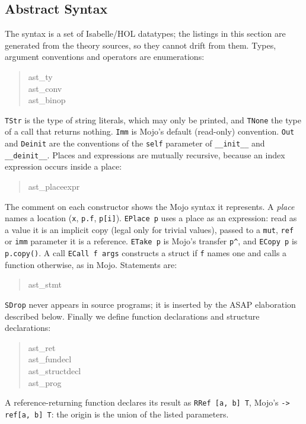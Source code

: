 \documentclass[11pt,a4paper]{article}
\newcommand{\usesnip}[1]{\csname #1\endcsname}
\newenvironment{snippet}{\begin{quote}\small}{\end{quote}}
\newcommand{\IHOL}{Isabelle/HOL}
\newcommand{\code}[1]{\texttt{#1}}
\begin{document}
\subsection{Abstract Syntax}
The syntax is a set of \IHOL{} datatypes; the listings in this section are
generated from the theory sources, so they cannot drift from them. Types,
argument conventions and operators are enumerations:
\begin{snippet}
\begin{isabelle}
\usesnip{ast_ty}\\[0.3em]
\usesnip{ast_conv}\\[0.3em]
\usesnip{ast_binop}
\end{isabelle}
\end{snippet}
\code{TStr} is the type of string literals, which may only be printed, and
\code{TNone} the type of a call that returns nothing. \code{Imm} is Mojo's default
(read-only) convention. \code{Out} and \code{Deinit} are the conventions of the
\code{self} parameter of \code{\_\_init\_\_} and \code{\_\_deinit\_\_}. Places and
expressions are mutually recursive, because an index expression occurs inside a
place:
\begin{snippet}
\begin{isabelle}
\usesnip{ast_placeexpr}
\end{isabelle}
\end{snippet}
The comment on each constructor shows the Mojo syntax it represents. A \emph{place} names a location (\code{x}, \code{p.f}, \code{p[i]}). \code{EPlace p}
uses a place as an expression: read as a value it is an implicit copy (legal
only for trivial values), passed to a \code{mut}, \code{ref} or \code{imm}
parameter it is a reference. \code{ETake p} is Mojo's transfer \code{p\^{}}, and
\code{ECopy p} is \code{p.copy()}. A call \code{ECall f args} constructs a struct if
\code{f} names one and calls a function otherwise, as in Mojo. Statements are:
\begin{snippet}
\begin{isabelle}
\usesnip{ast_stmt}
\end{isabelle}
\end{snippet}
\code{SDrop} never appears in source programs; it is inserted by the ASAP
elaboration described below. Finally we define function declarations and structure declarations:
\begin{snippet}
\begin{isabelle}
\usesnip{ast_ret}\\[0.3em]
\usesnip{ast_fundecl}\\[0.3em]
\usesnip{ast_structdecl}\\[0.3em]
\usesnip{ast_prog}
\end{isabelle}
\end{snippet}
A reference-returning function declares its result as \code{RRef [a, b] T},
Mojo's \code{-> ref[a, b] T}: the origin is the union of the listed parameters.
\end{document}
